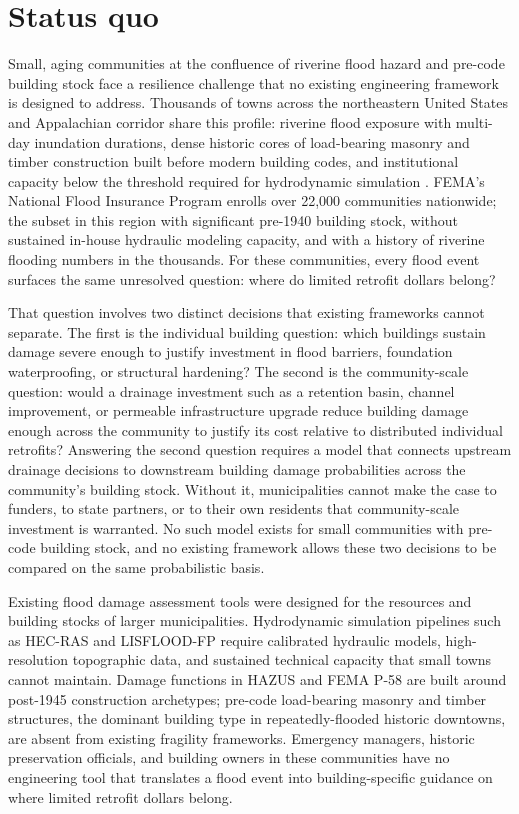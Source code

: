 \documentclass[11pt]{article}
\begin{document}

\section{Status quo}
Small, aging communities at the confluence of riverine flood hazard and pre-code building stock face a resilience challenge that no existing engineering framework is designed to address. 
Thousands of towns across the northeastern United States and Appalachian corridor share this profile: riverine flood exposure with multi-day inundation durations, dense historic cores of load-bearing masonry and timber construction built before modern building codes, and institutional capacity below the threshold required for hydrodynamic simulation \cite{placeholder_nfip_acs}.
FEMA's National Flood Insurance Program enrolls over 22,000 communities nationwide; the subset in this region with significant pre-1940 building stock, without sustained in-house hydraulic modeling capacity, and with a history of riverine flooding numbers in the thousands. 
For these communities, every flood event surfaces the same unresolved question: where do limited retrofit dollars belong?

That question involves two distinct decisions that existing frameworks cannot separate. 
The first is the individual building question: which buildings sustain damage severe enough to justify investment in flood barriers, foundation waterproofing, or structural hardening? 
The second is the community-scale question: would a drainage investment such as a retention basin, channel improvement, or permeable infrastructure upgrade reduce building damage enough across the community to justify its cost relative to distributed individual retrofits? 
Answering the second question requires a model that connects upstream drainage decisions to downstream building damage probabilities across the community's building stock.
Without it, municipalities cannot make the case to funders, to state partners, or to their own residents that community-scale investment is warranted. No such model exists for small communities with pre-code building stock, and no existing framework allows these two decisions to be compared on the same probabilistic basis.

Existing flood damage assessment tools were designed for the resources and building stocks of larger municipalities. Hydrodynamic simulation pipelines such as HEC-RAS and LISFLOOD-FP require calibrated hydraulic models, high-resolution topographic data, and sustained technical capacity that small towns cannot maintain. Damage functions in HAZUS and FEMA P-58 are built around post-1945 construction archetypes; pre-code load-bearing masonry and timber structures, the dominant building type in repeatedly-flooded historic downtowns, are absent from existing fragility frameworks. Emergency managers, historic preservation officials, and building owners in these communities have no engineering tool that translates a flood event into building-specific guidance on where limited retrofit dollars belong.
\end{document}
